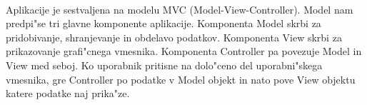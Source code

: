 \paragraph{}Aplikacije je sestvaljena na modelu MVC\cite{mvc-wiki} (Model-View-Controller). Model nam predpi"se tri glavne komponente aplikacije. Komponenta Model skrbi za pridobivanje, shranjevanje in obdelavo podatkov. Komponenta View skrbi za prikazovanje grafi"cnega vmesnika. Komponenta Controller pa povezuje Model in View med seboj. Ko uporabnik pritisne na dolo"ceno del uporabni"skega vmesnika, gre Controller po podatke v Model objekt in nato pove View objektu katere podatke naj prika"ze. 

